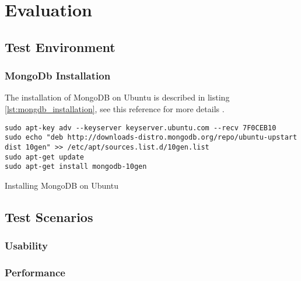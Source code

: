 \chapter{Evaluation\label{cha:chapter6}}


\section{Test Environment\label{sec:eval_te_en}}

\subsection{MongoDb Installation\label{sec:eval_te_en_mongo}}
The installation of MongoDB on Ubuntu is described in listing \ref{lst:mongdb_installation}, see this reference for more details \cite{MongoDb:installation}.
\begin{code}
\begin{verbatim}
sudo apt-key adv --keyserver keyserver.ubuntu.com --recv 7F0CEB10
sudo echo "deb http://downloads-distro.mongodb.org/repo/ubuntu-upstart dist 10gen" >> /etc/apt/sources.list.d/10gen.list
sudo apt-get update
sudo apt-get install mongodb-10gen
\end{verbatim}
\caption{Installing MongoDB on Ubuntu}
\label{lst:mongdb_installation}
\end{code}
\section{Test Scenarios\label{sec:eval__te_sc}}
	\subsection{Usability\label{seq:eval_usab}}
	
	\subsection{Performance\label{seq:eval_perf}}
